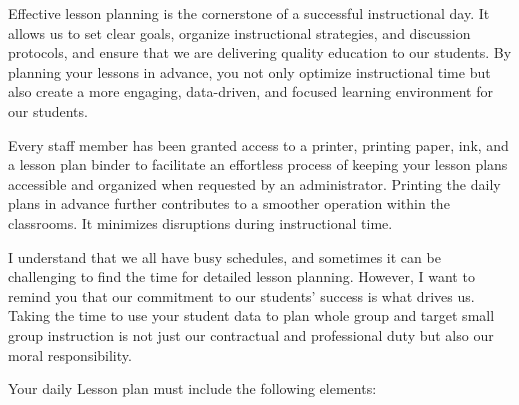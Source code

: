 \documentclass[11pt]{article}
\begin{document}
Effective lesson planning is the cornerstone of a successful instructional day. It allows us to set clear goals, organize instructional strategies, and discussion protocols, and ensure that we are delivering quality education to our students. By planning your lessons in advance, you not only optimize instructional time but also create a more engaging, data-driven, and focused learning environment for our students.

Every staff member has been granted access to a printer, printing paper, ink, and a lesson plan binder to facilitate an effortless process of keeping your lesson plans accessible and organized when requested by an administrator. Printing the daily plans in advance further contributes to a smoother operation within the classrooms. It minimizes disruptions during instructional time.

I understand that we all have busy schedules, and sometimes it can be challenging to find the time for detailed lesson planning. However, I want to remind you that our commitment to our students’ success is what drives us. Taking the time to use your student data to plan whole group and target small group instruction is not just our contractual and professional duty but also our moral responsibility.

Your daily Lesson plan must include the following elements:
\end{document}

